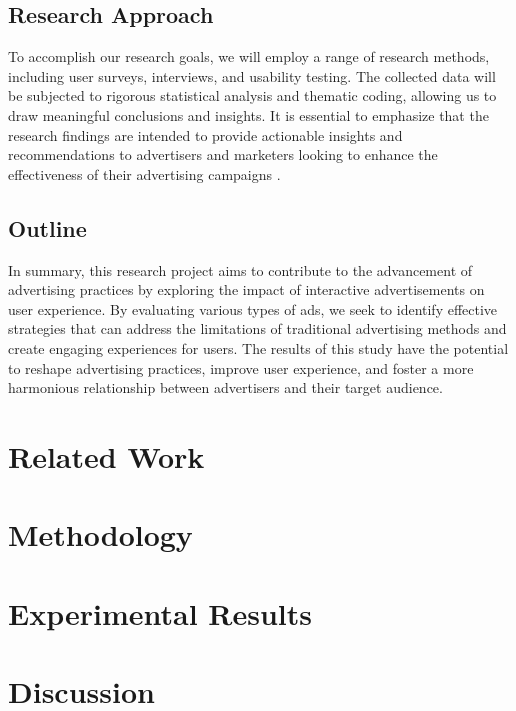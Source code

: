 \documentclass[journal]{IEEEtran}
\begin{document}
\subsection{Research Approach}
To accomplish our research goals, we will employ a range of research methods, including user
surveys, interviews, and usability testing. The collected data will be subjected to rigorous
statistical analysis and thematic coding, allowing us to draw meaningful conclusions and insights.
It is essential to emphasize that the research findings are intended to provide actionable
insights and recommendations to advertisers and marketers looking to enhance the
effectiveness of their advertising campaigns \cite{liang2008user}.

\subsection{Outline}
In summary, this research project aims to contribute to the advancement of advertising
practices by exploring the impact of interactive advertisements on user experience. By
evaluating various types of ads, we seek to identify effective strategies that can address
the limitations of traditional advertising methods and create engaging experiences for users.
The results of this study have the potential to reshape advertising practices, improve user
experience, and foster a more harmonious relationship between advertisers and their target audience.

\section{Related Work}

\section{Methodology}

\section{Experimental Results}

\section{Discussion}
\end{document}
